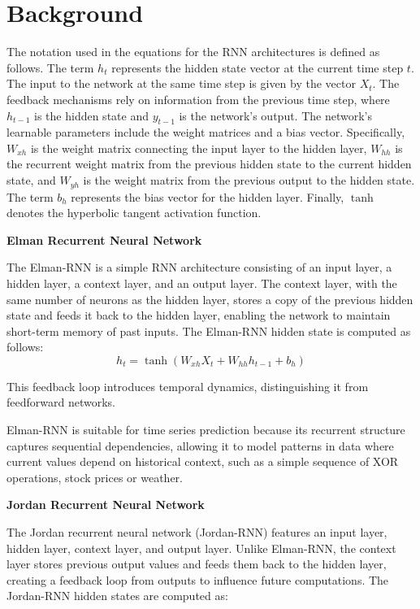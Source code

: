 \documentclass[conference, 10pt]{IEEEtran}
\begin{document}
\section{Background}

The notation used in the equations for the RNN architectures is defined as follows. The term $h_t$ represents the hidden
state vector at the current time step $t$. The input to the network at the same time step is given by the vector $X_t$.
The feedback mechanisms rely on information from the previous time step, where $h_{t-1}$ is the hidden state and
$y_{t-1}$ is the network's output. The network's learnable parameters include the weight matrices and a bias vector.
Specifically, $W_{xh}$ is the weight matrix connecting the input layer to the hidden layer, $W_{hh}$ is the recurrent
weight matrix from the previous hidden state to the current hidden state, and $W_{yh}$ is the weight matrix from the
previous output to the hidden state. The term $b_h$ represents the bias vector for the hidden layer. Finally, $\tanh$
denotes the hyperbolic tangent activation function.

\textbf{Elman Recurrent Neural Network }

The Elman-RNN is a simple RNN architecture consisting of an input layer, a hidden layer, a context layer, and an output
layer. The context layer, with the same number of neurons as the hidden layer, stores a copy of the previous hidden
state and feeds it back to the hidden layer, enabling the network to maintain short-term memory of past inputs. The
Elman-RNN hidden state is computed as follows:
$$h_t = \tanh(W_{xh}X_t + W_{hh}h_{t-1} + b_h)$$

This feedback loop introduces temporal dynamics, distinguishing it from feedforward
networks.

Elman-RNN is suitable for time series prediction because its recurrent structure captures sequential dependencies,
allowing it to model patterns in data where current values depend on historical context, such as a simple sequence of
XOR operations, stock prices or weather.

\textbf{Jordan Recurrent Neural Network }

The Jordan recurrent neural network (Jordan-RNN) features an input layer, hidden layer, context layer, and output layer. Unlike
Elman-RNN, the context layer stores previous output values and feeds them back to the hidden layer, creating a feedback
loop from outputs to influence future computations. The Jordan-RNN hidden states are computed as:
\end{document}
